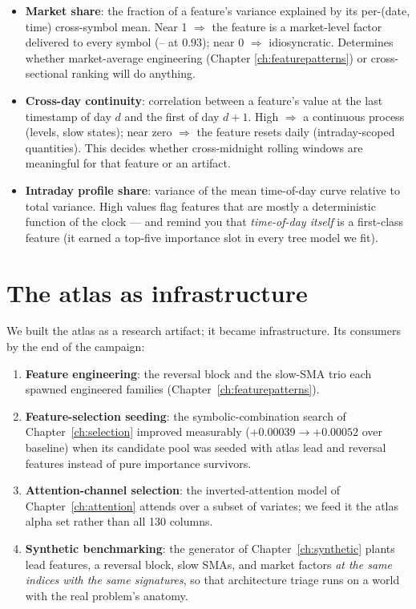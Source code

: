 \begin{itemize}
\item \textbf{Market share}: the fraction of a feature's variance explained
  by its per-(date, time) cross-symbol mean. Near 1 $\Rightarrow$ the
  feature is a market-level factor delivered to every symbol
  (-- at $0.93$); near 0 $\Rightarrow$ idiosyncratic.
  Determines whether market-average engineering (Chapter
  \ref{ch:featurepatterns}) or cross-sectional ranking will do anything.
\item \textbf{Cross-day continuity}: correlation between a feature's value
  at the last timestamp of day $d$ and the first of day $d{+}1$. High
  $\Rightarrow$ a continuous process (levels, slow states); near zero
  $\Rightarrow$ the feature resets daily (intraday-scoped quantities). This
  decides whether cross-midnight rolling windows are meaningful for that
  feature or an artifact.
\item \textbf{Intraday profile share}: variance of the mean time-of-day
  curve relative to total variance. High values flag features that are
  mostly a deterministic function of the clock --- and remind you that
  \emph{time-of-day itself} is a first-class feature (it earned a top-five
  importance slot in every tree model we fit).
\end{itemize}

\section{The atlas as infrastructure}

We built the atlas as a research artifact; it became infrastructure. Its
consumers by the end of the campaign:

\begin{enumerate}
\item \textbf{Feature engineering}: the reversal block and the slow-SMA trio
  each spawned engineered families (Chapter~\ref{ch:featurepatterns}).
\item \textbf{Feature-selection seeding}: the symbolic-combination search of
  Chapter~\ref{ch:selection} improved measurably ($+0.00039 \to +0.00052$
  over baseline) when its candidate pool was seeded with atlas lead and
  reversal features instead of pure importance survivors.
\item \textbf{Attention-channel selection}: the inverted-attention model of
  Chapter~\ref{ch:attention} attends over a subset of variates; we feed it
  the atlas alpha set rather than all 130 columns.
\item \textbf{Synthetic benchmarking}: the generator of
  Chapter~\ref{ch:synthetic} plants lead features, a reversal block, slow
  SMAs, and market factors \emph{at the same indices with the same
  signatures}, so that architecture triage runs on a world with the real
  problem's anatomy.
\end{enumerate}

